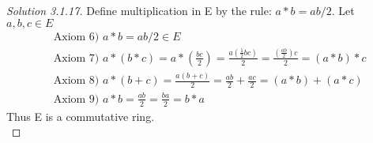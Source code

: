 \documentclass[12pt]{article}
\begin{document}
	\begin{proof}[Solution 3.1.17] 
	Define multiplication in E by the rule: $a * b = ab/2 $. Let $a,b,c \in E$
	\\
	\begin{align*}
		&\text{Axiom 6) } a*b = ab/2 \in E \\
		&\text{Axiom 7) } a*(b*c) = a*\left(\frac{bc}{2}\right) = \frac{a \left(\frac{1}{2} bc\right)}{2} = \frac{\left(\frac{ab}{2}\right) c}{2} = (a*b)*c \\
		&\text{Axiom 8) } a*(b+c) = \frac{a(b+c)}{2} = \frac{ab}{2} + \frac{ac}{2} = (a*b) + (a*c)\\
		&\text{Axiom 9) } a*b = \frac{ab}{2} = \frac{ba}{2} = b*a
	\end{align*}
	Thus E is a commutative ring. \\
	\end{proof}

  
\end{document}
